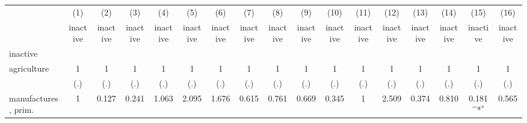 {
\def\sym#1{\ifmmode^{#1}\else\(^{#1}\)\fi}
\begin{tabular}{l*{16}{c}}
\hline\hline
                    &\multicolumn{1}{c}{(1)}&\multicolumn{1}{c}{(2)}&\multicolumn{1}{c}{(3)}&\multicolumn{1}{c}{(4)}&\multicolumn{1}{c}{(5)}&\multicolumn{1}{c}{(6)}&\multicolumn{1}{c}{(7)}&\multicolumn{1}{c}{(8)}&\multicolumn{1}{c}{(9)}&\multicolumn{1}{c}{(10)}&\multicolumn{1}{c}{(11)}&\multicolumn{1}{c}{(12)}&\multicolumn{1}{c}{(13)}&\multicolumn{1}{c}{(14)}&\multicolumn{1}{c}{(15)}&\multicolumn{1}{c}{(16)}\\
                    &\multicolumn{1}{c}{inactive}&\multicolumn{1}{c}{inactive}&\multicolumn{1}{c}{inactive}&\multicolumn{1}{c}{inactive}&\multicolumn{1}{c}{inactive}&\multicolumn{1}{c}{inactive}&\multicolumn{1}{c}{inactive}&\multicolumn{1}{c}{inactive}&\multicolumn{1}{c}{inactive}&\multicolumn{1}{c}{inactive}&\multicolumn{1}{c}{inactive}&\multicolumn{1}{c}{inactive}&\multicolumn{1}{c}{inactive}&\multicolumn{1}{c}{inactive}&\multicolumn{1}{c}{inactive}&\multicolumn{1}{c}{inactive}\\
\hline
inactive            &                     &                     &                     &                     &                     &                     &                     &                     &                     &                     &                     &                     &                     &                     &                     &                     \\
agriculture         &           1         &           1         &           1         &           1         &           1         &           1         &           1         &           1         &           1         &           1         &           1         &           1         &           1         &           1         &           1         &           1         \\
                    &         (.)         &         (.)         &         (.)         &         (.)         &         (.)         &         (.)         &         (.)         &         (.)         &         (.)         &         (.)         &         (.)         &         (.)         &         (.)         &         (.)         &         (.)         &         (.)         \\
[1em]
manufactures, prim. &           1         &       0.127         &       0.241         &       1.063         &       2.095         &       1.676         &       0.615         &       0.761         &       0.669         &       0.345         &           1         &       2.509         &       0.374         &       0.810         &       0.181\sym{*}  &       0.565         \\

\end{tabular}}
